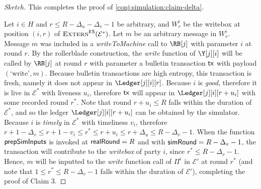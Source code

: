 \begin{proof}[Sketch]
  This completes the proof of \ref{conj:simulation:claim-delta}.




  Let $i \in H$ and $r \leq R - \Delta_u - \Delta_v - 1$ be arbitrary, and $W^i_r$ be the writebox
  at position $(i, r)$ of $\textsc{Extern}^{\textsf{ES}}(\mathcal{E}^*)$. Let $m$ be an arbitrary message
  in $W^i_r$. Message $m$ was included in a \emph{writeToMachine} call to $\RB[j]$
  with parameter $i$ at round $r$. By the rollerblade construction, the \emph{write}
  function of $\Y[j][i]$ will be called by $\RB[j]$ at round $r$ with parameter a bulletin
  transaction $\textsf{tx}$ with payload $(\text{`write'}, m)$. Because bulletin transactions are high entropy,
  this transaction is fresh, namely it does not appear in $\Ledger[j][i][r]$.
  Because $i$ is \emph{good}, therefore it is live in $\mathcal{E}^*$ with liveness $u_i$,
  therefore $\textsf{tx}$ will appear in $\Ledger[j][i][r + u_i]$ with some recorded round $r^*$.
  Note that round $r + u_i \leq R$ falls within the duration of $\mathcal{E}^*$, and
  so the ledger $\Ledger[j][i][r + u_i]$ can be obtained by the simulator.
  Because $i$ is \emph{timely} in $\mathcal{E}^*$ with timeliness $v_i$, therefore
  $r + 1 - \Delta_v \leq r + 1 - v_i \leq r^* \leq r + u_i \leq r + \Delta_u \leq R - \Delta_v - 1$.
  When the function $\textsf{prepSimInputs}$ is invoked at $\textsf{realRound} = R$
  and with $\textsf{simRound} = R - \Delta_v - 1$, the transaction will contribute
  to the \emph{writebox} of party $i$, since $r^* \leq R - \Delta_v - 1$.
  Hence, $m$ will be inputted to the \emph{write} function call of $\Pi^i$
  in $\mathcal{E}'$ at round $r^*$ (and note that $1 \leq r^* \leq R - \Delta_v - 1$ falls
  within the duration of $\mathcal{E}'$), completing the proof of Claim 3.
  \Qed
\end{proof}